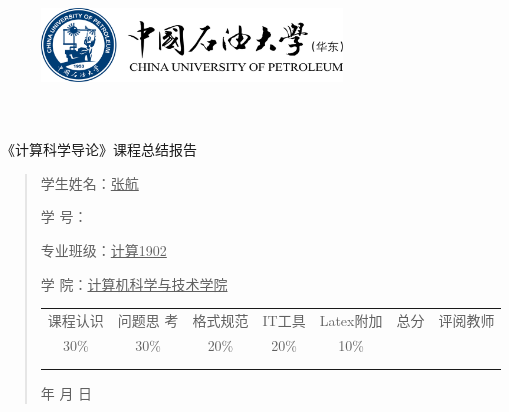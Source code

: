 \documentclass{article}
\renewcommand{\today}{\number\year 年 \number\month 月 \number\day 日}
\begin{document}
\begin{figure}
    \centering
    \includegraphics[width=8cm]{upc.png}

    \label{figupc}
\end{figure}

	\begin{center}
		\quad \\
		\quad \\
		\heiti \fontsize{45}{17} \quad \quad \quad 
		\vskip 1.5cm
		\heiti {} 《计算科学导论》课程总结报告
	\end{center}
	\vskip 2.0cm
		
	\begin{quotation}
		\doublespacing
		
        \par\setlength\parindent{7em}
		\quad 

		学生姓名：\underline{\qquad  张航 \qquad \qquad}

		学\hspace{0.61cm} 号：\underline{\qquad}
		
		专业班级：\underline{\qquad 计算1902 \qquad  }
		
        学\hspace{0.61cm} 院：\underline{计算机科学与技术学院}
		\vskip 2cm
		\centering
		\begin{table}[h]
            \centering 
            \begin{tabular}{|c|c|c|c|c|c|c|}
                \hline
                课程认识 & 问题思 考 & 格式规范  & IT工具  & Latex附加  & 总分 & 评阅教师 \\
                30\% & 30\% & 20\% & 20\% & 10\% &  &  \\
                \hline
                 & & & & & &\\
                & & & & & &\\
                \hline
            \end{tabular}
        \end{table}
		\vskip 2cm
		\today
	\end{quotation}
\end{document}
